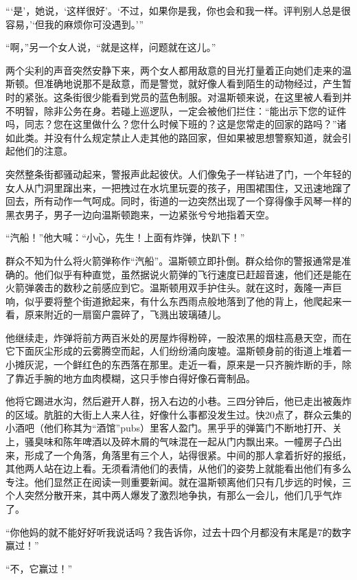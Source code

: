 ``{}`是'，她说，`这样很好'。`不过，如果你是我，你也会和我一样。评判别人总是很容易，'`但我的麻烦你可没遇到。'{}''

``啊，''另一个女人说，``就是这样，问题就在这儿。''

两个尖利的声音突然安静下来，两个女人都用敌意的目光打量着正向她们走来的温斯顿。但准确地说那不是敌意，而是警觉，就好像人看到陌生的动物经过，产生暂时的紧张。这条街很少能看到党员的蓝色制服。对温斯顿来说，在这里被人看到并不明智，除非公务在身。若碰上巡逻队，一定会被他们拦住：``能出示下您的证件吗，同志？您在这里做什么？您什么时候下班的？这是您常走的回家的路吗？''诸如此类。并没有什么规定禁止人走其他的路回家，但如果被思想警察知道，就会引起他们的注意。

突然整条街都骚动起来，警报声此起彼伏。人们像兔子一样钻进了门，一个年轻的女人从门洞里蹿出来，一把拽过在水坑里玩耍的孩子，用围裙围住，又迅速地蹿了回去，所有动作一气呵成。同时，街道的一边突然出现了一个穿得像手风琴一样的黑衣男子，男子一边向温斯顿跑来，一边紧张兮兮地指着天空。

``汽船！''他大喊：``小心，先生！上面有炸弹，快趴下！''

群众不知为什么将火箭弹称作``汽船''。温斯顿立即扑倒。群众给你的警报通常是准确的。他们似乎有种直觉，虽然据说火箭弹的飞行速度已赶超音速，他们还是能在火箭弹袭击的数秒之前感应到它。温斯顿用双手护住头。就在这时，轰隆一声巨响，似乎要将整个街道掀起来，有什么东西雨点般地落到了他的背上，他爬起来一看，原来附近的一扇窗户震碎了，飞溅出玻璃碴儿。

他继续走，炸弹将前方两百米处的房屋炸得粉碎，一股浓黑的烟柱高悬天空，而在它下面灰尘形成的云雾腾空而起，人们纷纷涌向废墟。温斯顿身前的街道上堆着一小摊灰泥，一个鲜红色的东西落在那里。走近一看，原来是一只齐腕炸断的手，除了靠近手腕的地方血肉模糊，这只手惨白得好像石膏制品。

他将它踢进水沟，然后避开人群，拐入右边的小巷。三四分钟后，他已走出被轰炸的区域。肮脏的大街上人来人往，好像什么事都没发生过。快20点了，群众云集的小酒吧（他们称其为``酒馆''pubs）里客人盈门。黑乎乎的弹簧门不断地打开、关上，骚臭味和陈年啤酒以及碎木屑的气味混在一起从门内飘出来。一幢房子凸出来，形成了一个角落，角落里有三个人，站得很紧。中间的那人拿着折好的报纸，其他两人站在边上看。无须看清他们的表情，从他们的姿势上就能看出他们有多么专注。他们显然正在阅读一则重要新闻。就在温斯顿离他们只有几步远的时候，三个人突然分散开来，其中两人爆发了激烈地争执，有那么一会儿，他们几乎气炸了。

``你他妈的就不能好好听我说话吗？我告诉你，过去十四个月都没有末尾是7的数字赢过！''

``不，它赢过！''

